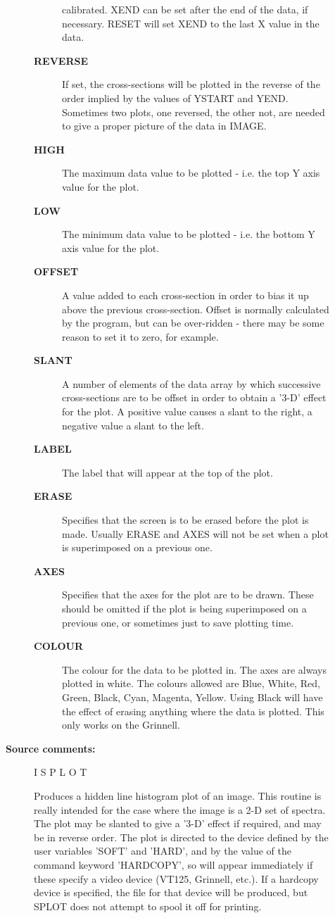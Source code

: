 \begin{description}
\begin{description}
\begin{description}
 calibrated.  XEND can be set after the end of the data, if necessary.
 RESET will set XEND to the last X value in the data.
\item [\textbf{REVERSE}]
 If set, the cross-sections will be plotted in the reverse of
 the order implied by the values of YSTART and YEND. Sometimes
 two plots, one reversed, the other not, are needed to give a
 proper picture of the data in IMAGE.
\item [\textbf{HIGH}]
 The maximum data value to be plotted - i.e. the top Y axis
 value for the plot.
\item [\textbf{LOW}]
 The minimum data value to be plotted - i.e. the bottom Y axis
 value for the plot.
\item [\textbf{OFFSET}]
 A value added to each cross-section in order to bias it up
 above the previous cross-section.  Offset is normally calculated by
 the program, but can be over-ridden - there may be some reason to set
 it to zero, for example.
\item [\textbf{SLANT}]
 A number of elements of the data array by which successive
 cross-sections are to be offset in order to obtain a '3-D' effect for
 the plot.  A positive value causes a slant to the right, a negative
 value a slant to the left.
\item [\textbf{LABEL}]
 The label that will appear at the top of the plot.
\item [\textbf{ERASE}]
 Specifies that the screen is to be erased before the plot is
 made.  Usually ERASE and AXES will not be set when a plot is
 superimposed on a previous one.
\item [\textbf{AXES}]
 Specifies that the axes for the plot are to be drawn.  These
 should be omitted if the plot is being superimposed on a previous
 one, or sometimes just to save plotting time.
\item [\textbf{COLOUR}]
 The colour for the data to be plotted in.
 The axes are always plotted in white.  The colours allowed are Blue,
 White, Red, Green, Black, Cyan, Magenta, Yellow.  Using Black will
 have the effect of erasing anything where the data is plotted.  This
 only works on the Grinnell.
\end{description}

\item [\textbf{Source comments:}]
\begin{terminalv}
 I S P L O T

 Produces a hidden line histogram plot of an image.  This routine
 is really intended for the case where the image is a 2-D set of
 spectra.  The plot may be slanted to give a '3-D' effect if
 required, and may be in reverse order.  The plot is directed
 to the device defined by the user variables 'SOFT' and
 'HARD', and by the value of the command keyword 'HARDCOPY',
 so will appear immediately if these specify a video
 device (VT125, Grinnell, etc.).  If a hardcopy device is
 specified, the file for that device will be produced,
 but SPLOT does not attempt to spool it off for printing.


\end{terminalv}
\end{description}
\end{description}
